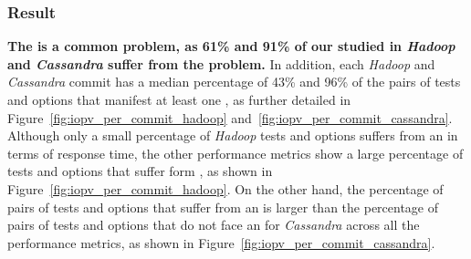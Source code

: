 \subsubsection*{Result}

\noindent \textbf{The \inconsistent is a common problem, as 61\% and 91\% of our studied \instance in \emph{Hadoop} and \emph{Cassandra} suffer from the \inconsistent problem.} In addition, each \emph{Hadoop} and \emph{Cassandra} commit has a median  percentage of 43\% and 96\% of the pairs of tests and options that manifest at least one \inconsistent, as further detailed in Figure~\ref{fig:iopv_per_commit_hadoop} and~\ref{fig:iopv_per_commit_cassandra}. Although only a small percentage of \emph{Hadoop} tests and options suffers from an \inconsistent in terms of response time, the other performance metrics show a large percentage of tests and options that suffer form \inconsistent, as shown in Figure~\ref{fig:iopv_per_commit_hadoop}.  On the other hand, the percentage of pairs of tests and options that suffer from an \inconsistent is larger than the percentage of pairs of tests and options that do not face an \inconsistent for \emph{Cassandra} across all the performance metrics, as shown in Figure~\ref{fig:iopv_per_commit_cassandra}.  %

